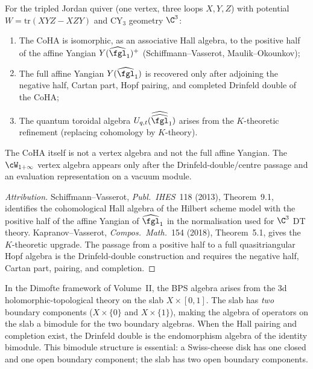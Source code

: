 \begin{proposition}
\label{prop:coha-quantum-group}
For the tripled Jordan quiver (one vertex, three loops $X,Y,Z$) with
potential $W = \mathrm{tr}(XYZ-XZY)$ and CY$_3$ geometry $\C^3$:
\begin{enumerate}[label=(\roman*)]
 \item The CoHA is isomorphic, as an associative Hall algebra, to the positive half of the affine
 Yangian $Y(\widehat{\fgl}_1)^+$ (Schiffmann--Vasserot,
 Maulik--Okounkov);
 \item The full affine Yangian $Y(\widehat{\fgl}_1)$ is recovered only
 after adjoining the negative half, Cartan part, Hopf pairing, and
 completed Drinfeld double of the CoHA;
 \item The quantum toroidal algebra
 $U_{q,t}(\widehat{\widehat{\fgl}}_1)$ arises from the
 $K$-theoretic refinement (replacing cohomology by $K$-theory).
\end{enumerate}
The CoHA itself is not a vertex algebra and not the full affine
Yangian. The $\cW_{1+\infty}$ vertex algebra appears only after the
Drinfeld-double/centre passage and an evaluation representation on a
vacuum module.
\end{proposition}

\begin{proof}[Attribution]
Schiffmann--Vasserot, \emph{Publ.\ IHES}~118 (2013), Theorem~9.1,
identifies the cohomological Hall algebra of the Hilbert scheme model
with the positive half of the affine Yangian of $\widehat{\fgl}_1$ in
the normalisation used for $\C^3$ DT theory. Kapranov--Vasserot,
\emph{Compos.\ Math.}~154 (2018), Theorem~5.1, gives the $K$-theoretic
upgrade. The passage from a positive half to a full quasitriangular
Hopf algebra is the Drinfeld-double construction and requires the
negative half, Cartan part, pairing, and completion.
\end{proof}

\begin{remark}
\label{rem:bps-slab}
In the Dimofte framework of Volume~II, the BPS algebra
arises from the 3d holomorphic-topological theory on the slab
$X \times [0,1]$. The slab has \emph{two} boundary components
($X \times \{0\}$ and $X \times \{1\}$), making the algebra of
operators on the slab a bimodule for the two boundary algebras.
When the Hall pairing and completion exist, the Drinfeld double is the
endomorphism algebra of the identity bimodule. This bimodule structure
is essential: a Swiss-cheese
disk has one closed and one open boundary component; the slab has
two open boundary components.
\end{remark}

